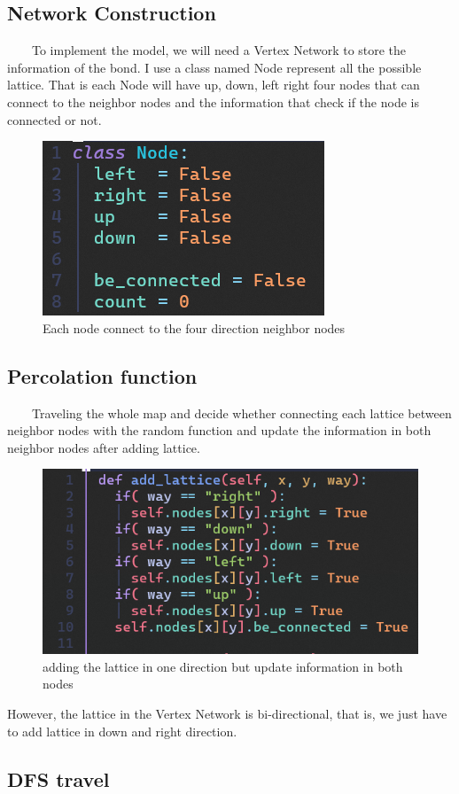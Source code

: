 \documentclass{article}
\begin{document}
\subsection{Network Construction}
~~~~To implement the model, we will need a Vertex Network to store the information of the bond. I use a class named Node represent all the possible lattice. That is each Node will have up, down, left right four nodes that can connect to the neighbor nodes and the information that check if the node is connected or not.

\begin{figure}[h]
\centering
\includegraphics[width=0.28\linewidth]{Node.png}
\caption{\label{fig:Node}Each node connect to the four direction neighbor nodes}
\end{figure}


\subsection{Percolation function}
~~~~Traveling the whole map and decide whether connecting each lattice between neighbor nodes with the random function and update the information in both neighbor nodes after adding lattice.

\begin{figure}[h]
\centering
\includegraphics[width=0.55\linewidth]{add_latice.png}
\caption{\label{fig:add_lattice} adding the lattice in one direction but update information in both nodes}
\end{figure}

However,  the lattice in the Vertex Network is bi-directional, that is, we just have to add lattice in down and right direction.

\subsection{DFS travel}
\end{document}
